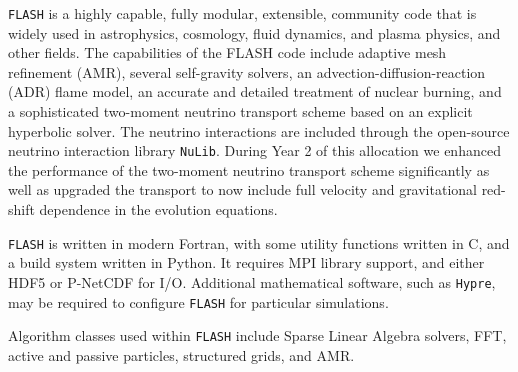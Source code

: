 \documentclass[12pt,titlepage]{article}
\begin{document}
\texttt{FLASH} is a highly capable, fully modular, extensible,
community code that is widely used in astrophysics, cosmology, fluid
dynamics, and plasma physics, and other fields.  The capabilities of
the FLASH code include adaptive mesh refinement (AMR), several
self-gravity solvers, an advection-diffusion-reaction (ADR) flame
model, an accurate and detailed treatment of nuclear burning, and a
sophisticated two-moment neutrino transport scheme based on an
explicit hyperbolic solver.  The neutrino interactions are included
through the open-source neutrino interaction library
\texttt{NuLib}. During Year 2 of this allocation we enhanced the
performance of the two-moment neutrino transport scheme significantly
as well as upgraded the transport to now include full velocity and
gravitational red-shift dependence in the evolution equations.

\texttt{FLASH} is written in modern Fortran, with some utility
functions written in C, and a build system written in Python.  It
requires MPI library support, and either HDF5 or P-NetCDF for I/O.
Additional mathematical software, such as \texttt{Hypre}, may be
required to configure \texttt{FLASH} for particular simulations.

Algorithm classes used within \texttt{FLASH} include Sparse Linear
Algebra solvers, FFT, active and passive particles, structured grids,
and AMR.
\end{document}
